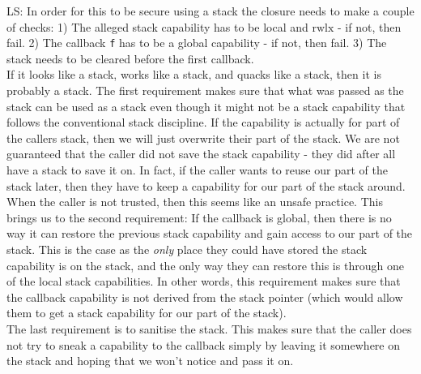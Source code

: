 \documentclass[a4paper]{article}
\newcommand\lau[1]{{\color{purple} \sf \footnotesize {LS: #1}}\\}
\newcommand{\plainperm}[1]{\mathrm{#1}}
\newcommand{\rwlx}{\plainperm{rwlx}}
\begin{document}
\lau{In order for this to be secure using a stack the closure needs to make a couple of checks: 1) The alleged stack capability has to be local and $\rwlx$ - if not, then fail. 2) The callback \texttt{f} has to be a global capability - if not, then fail. 3) The stack needs to be cleared before the first callback. \\If it looks like a stack, works like a stack, and quacks like a stack, then it is probably a stack. The first requirement makes sure that what was passed as the stack can be used as a stack even though it might not be a stack capability that follows the conventional stack discipline. If the capability is actually for part of the callers stack, then we will just overwrite their part of the stack. We are not guaranteed that the caller did not save the stack capability - they did after all have a stack to save it on. In fact, if the caller wants to reuse our part of the stack later, then they have to keep a capability for our part of the stack around. When the caller is not trusted, then this seems like an unsafe practice. This brings us to the second requirement: If the callback is global, then there is no way it can restore the previous stack capability and gain access to our part of the stack. This is the case as the \emph{only} place they could have stored the stack capability is on the stack, and the only way they can restore this is through one of the local stack capabilities. In other words, this requirement makes sure that the callback capability is not derived from the stack pointer (which would allow them to get a stack capability for our part of the stack).\\ The last requirement is to sanitise the stack. This makes sure that the caller does not try to sneak a capability to the callback simply by leaving it somewhere on the stack and hoping that we won't notice and pass it on. }
\end{document}
